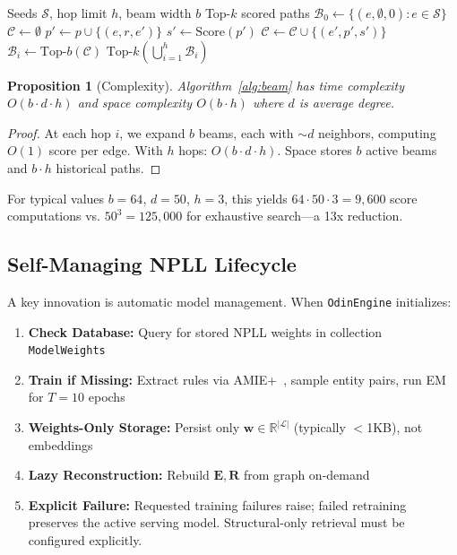 \documentclass[10pt,twocolumn]{article}
\newtheorem{proposition}{Proposition}
\begin{document}
\begin{algorithm}[t]
\caption{Multi-Signal Beam Search}
\label{alg:beam}
\begin{algorithmic}[1]
\REQUIRE Seeds $\mathcal{S}$, hop limit $h$, beam width $b$
\ENSURE Top-$k$ scored paths
\STATE $\mathcal{B}_0 \gets \{(e, \emptyset, 0) : e \in \mathcal{S}\}$ 
    \STATE $\mathcal{C} \gets \emptyset$ 
            \STATE $p' \gets p \cup \{(e, r, e')\}$
            \STATE $s' \gets \text{Score}(p')$ 
            \STATE $\mathcal{C} \gets \mathcal{C} \cup \{(e', p', s')\}$
        \ENDFOR
    \ENDFOR
    \STATE $\mathcal{B}_i \gets \text{Top-}b(\mathcal{C})$ 
\ENDFOR
\RETURN $\text{Top-}k(\bigcup_{i=1}^{h} \mathcal{B}_i)$
\end{algorithmic}
\end{algorithm}

\begin{proposition}[Complexity]
Algorithm~\ref{alg:beam} has time complexity $O(b \cdot d \cdot h)$ and space complexity $O(b \cdot h)$ where $d$ is average degree.
\end{proposition}

\begin{proof}
At each hop $i$, we expand $b$ beams, each with $\sim d$ neighbors, computing $O(1)$ score per edge. With $h$ hops: $O(b \cdot d \cdot h)$. Space stores $b$ active beams and $b \cdot h$ historical paths.
\end{proof}

For typical values $b=64$, $d=50$, $h=3$, this yields $64 \cdot 50 \cdot 3 = 9,600$ score computations vs. $50^3 = 125,000$ for exhaustive search---a 13x reduction.

\subsection{Self-Managing NPLL Lifecycle}

A key innovation is automatic model management. When \texttt{OdinEngine} initializes:

\begin{enumerate}
\item \textbf{Check Database:} Query for stored NPLL weights in collection \texttt{ModelWeights}
\item \textbf{Train if Missing:} Extract rules via AMIE+~\cite{galarraga2015fast}, sample entity pairs, run EM for $T=10$ epochs
\item \textbf{Weights-Only Storage:} Persist only $\mathbf{w} \in \mathbb{R}^{|\mathcal{L}|}$ (typically $<$1KB), not embeddings
\item \textbf{Lazy Reconstruction:} Rebuild $\mathbf{E}, \mathbf{R}$ from graph on-demand
\item \textbf{Explicit Failure:} Requested training failures raise; failed retraining preserves the active serving model. Structural-only retrieval must be configured explicitly.
\end{enumerate}
\end{document}
